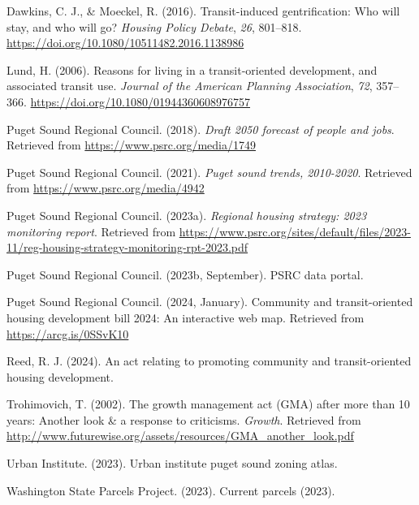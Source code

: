 \documentclass[
]{agujournal2019}
\newlength{\cslhangindent}
\newenvironment{CSLReferences}[2] %
 {\begin{list}{}{%
  \setlength{\itemindent}{0pt}
  \setlength{\leftmargin}{0pt}
  \setlength{\parsep}{0pt}
  \ifodd #1
   \setlength{\leftmargin}{\cslhangindent}
   \setlength{\itemindent}{-1\cslhangindent}
  \fi
  \setlength{\itemsep}{#2\baselineskip}}}
 {\end{list}}
\begin{document}
\label{refs}
\begin{CSLReferences}{1}{0}
\vspace{1em}

Dawkins, C. J., \& Moeckel, R. (2016). Transit-induced gentrification:
Who will stay, and who will go? \emph{Housing Policy Debate}, \emph{26},
801--818. \url{https://doi.org/10.1080/10511482.2016.1138986}

Lund, H. (2006). Reasons for living in a transit-oriented development,
and associated transit use. \emph{Journal of the American Planning
Association}, \emph{72}, 357--366.
\url{https://doi.org/10.1080/01944360608976757}

Puget Sound Regional Council. (2018). \emph{Draft 2050 forecast of
people and jobs}. Retrieved from \url{https://www.psrc.org/media/1749}

Puget Sound Regional Council. (2021). \emph{Puget sound trends,
2010-2020}. Retrieved from \url{https://www.psrc.org/media/4942}

Puget Sound Regional Council. (2023a). \emph{Regional housing strategy:
2023 monitoring report}. Retrieved from
\url{https://www.psrc.org/sites/default/files/2023-11/reg-housing-strategy-monitoring-rpt-2023.pdf}

Puget Sound Regional Council. (2023b, September). PSRC data portal.

Puget Sound Regional Council. (2024, January). Community and
transit-oriented housing development bill 2024: An interactive web map.
Retrieved from \url{https://arcg.is/0SSvK10}

Reed, R. J. (2024). An act relating to promoting community and
transit-oriented housing development.

Trohimovich, T. (2002). The growth management act (GMA) after more than
10 years: Another look \& a response to criticisms. \emph{Growth}.
Retrieved from
\url{http://www.futurewise.org/assets/resources/GMA_another_look.pdf}

Urban Institute. (2023). Urban institute puget sound zoning atlas.

Washington State Parcels Project. (2023). Current parcels (2023).

\end{CSLReferences}
\end{document}
